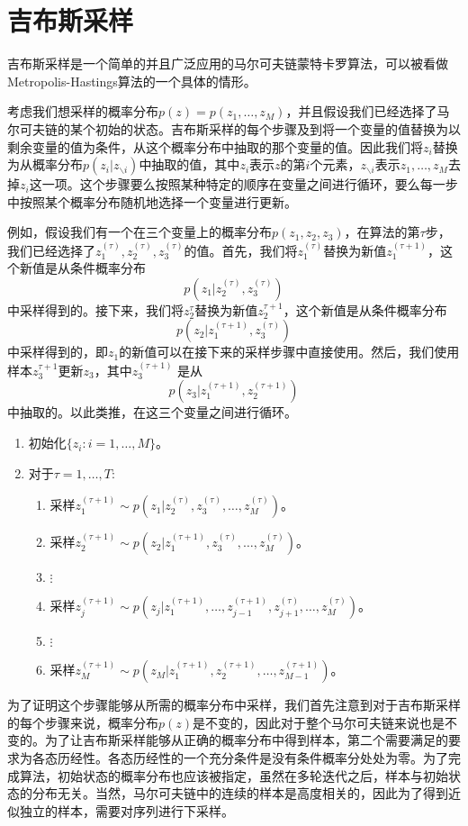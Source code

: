 \section{吉布斯采样}
吉布斯采样是一个简单的并且广泛应用的马尔可夫链蒙特卡罗算法，可以被看做Metropolis-Hastings算法的一个具体的情形。

考虑我们想采样的概率分布$p(z)=p(z_1,\dots,z_M)$，并且假设我们已经选择了马尔可夫链的某个初始的状态。吉布斯采样的每个步骤及到将一个变量的值替换为以剩余变量的值为条件，从这个概率分布中抽取的那个变量的值。因此我们将$z_i$替换为从概率分布$p(z_i|z_{\backslash i})$中抽取的值，其中$z_i$表示$z$的第$i$个元素，$z_{\backslash i}$表示$z_1,\dots,z_M$去掉$z_i$这一项。这个步骤要么按照某种特定的顺序在变量之间进行循环，要么每一步中按照某个概率分布随机地选择一个变量进行更新。

例如，假设我们有一个在三个变量上的概率分布$p(z_1,z_2,z_3)$，在算法的第$\tau$步，我们已经选择了$z_1^{(\tau)},z_2^{(\tau)},z_3^{(\tau)}$的值。首先，我们将$z_1^{(\tau)}$替换为新值$z_1^{(\tau+1)}$，这个新值是从条件概率分布
\begin{equation}
	p(z_1|z_2^{(\tau)},z_3^{(\tau)})
\end{equation}
中采样得到的。接下来，我们将$z_2^{\tau}$替换为新值$z_2^{\tau+1}$，这个新值是从条件概率分布
\begin{equation}
	p(z_2|z_1^{(\tau+1)},z_3^{(\tau)})
\end{equation}
中采样得到的，即$z_1$的新值可以在接下来的采样步骤中直接使用。然后，我们使用样本$z_3^{\tau+1}$更新$z_3$，其中$z_3^{(\tau+1)}$
是从
\begin{equation}
	p(z_3|z_1^{(\tau+1)},z_2^{(\tau+1)})
\end{equation}
中抽取的。以此类推，在这三个变量之间进行循环。
\begin{enumerate}
	\item 初始化$\{z_i:i=1,\dots,M \}$。
	\item 对于$\tau=1,\dots,T:$
	\begin{enumerate}[-]
		\item 采样$z_1^{(\tau+1)}\sim p(z_1|z_2^{(\tau)},z_3^{(\tau)},\dots,z_M^{(\tau)})$。
		\item 采样$z_2^{(\tau+1)}\sim p(z_2|z_1^{(\tau+1)},z_3^{(\tau)},\dots,z_M^{(\tau)})$。
		\item $\vdots$
		\item 采样$z_j^{(\tau+1)}\sim p(z_j|z_1^{(\tau+1)},\dots,z_{j-1}^{(\tau+1)},z_{j+1}^{(\tau)},\dots,z_M^{(\tau)})$。
		\item $\vdots$
		\item 采样$z_M^{(\tau+1)}\sim p(z_M|z_1^{(\tau+1)},z_2^{(\tau+1)},\dots,z_{M-1}^{(\tau+1)})$。
	\end{enumerate}
\end{enumerate}
为了证明这个步骤能够从所需的概率分布中采样，我们首先注意到对于吉布斯采样的每个步骤来说，概率分布$p(z)$是不变的，因此对于整个马尔可夫链来说也是不变的。为了让吉布斯采样能够从正确的概率分布中得到样本，第二个需要满足的要求为各态历经性。各态历经性的一个充分条件是没有条件概率分处处为零。为了完成算法，初始状态的概率分布也应该被指定，虽然在多轮迭代之后，样本与初始状态的分布无关。当然，马尔可夫链中的连续的样本是高度相关的，因此为了得到近似独立的样本，需要对序列进行下采样。

